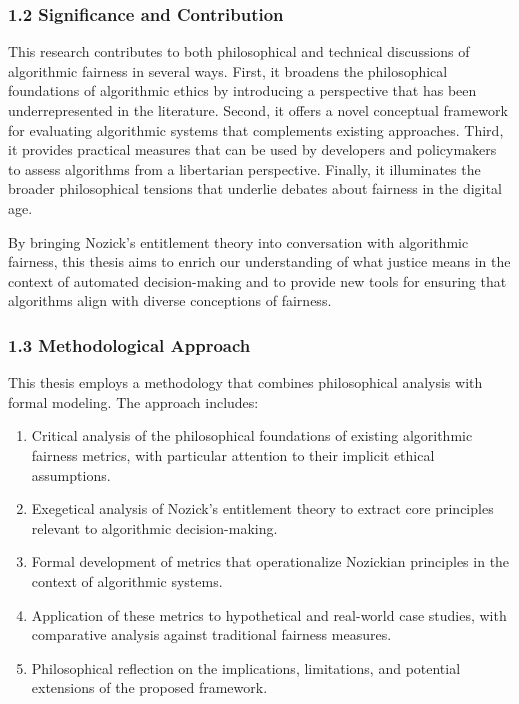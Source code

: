 \subsubsection{1.2 Significance and
Contribution}\label{significance-and-contribution}

This research contributes to both philosophical and technical
discussions of algorithmic fairness in several ways. First, it broadens
the philosophical foundations of algorithmic ethics by introducing a
perspective that has been underrepresented in the literature. Second, it
offers a novel conceptual framework for evaluating algorithmic systems
that complements existing approaches. Third, it provides practical
measures that can be used by developers and policymakers to assess
algorithms from a libertarian perspective. Finally, it illuminates the
broader philosophical tensions that underlie debates about fairness in
the digital age.

By bringing Nozick's entitlement theory into conversation with
algorithmic fairness, this thesis aims to enrich our understanding of
what justice means in the context of automated decision-making and to
provide new tools for ensuring that algorithms align with diverse
conceptions of fairness.

\subsubsection{1.3 Methodological
Approach}\label{methodological-approach}

This thesis employs a methodology that combines philosophical analysis
with formal modeling. The approach includes:

\begin{enumerate}
\def\labelenumi{\arabic{enumi}.}
\item
  Critical analysis of the philosophical foundations of existing
  algorithmic fairness metrics, with particular attention to their
  implicit ethical assumptions.
\item
  Exegetical analysis of Nozick's entitlement theory to extract core
  principles relevant to algorithmic decision-making.
\item
  Formal development of metrics that operationalize Nozickian principles
  in the context of algorithmic systems.
\item
  Application of these metrics to hypothetical and real-world case
  studies, with comparative analysis against traditional fairness
  measures.
\item
  Philosophical reflection on the implications, limitations, and
  potential extensions of the proposed framework.
\end{enumerate}

